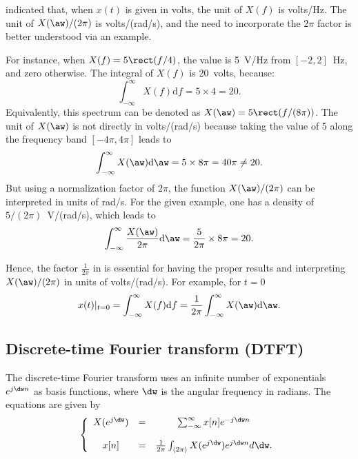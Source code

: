  indicated that, when $x(t)$ is given in volts, the unit of $X(f)$ is volts/Hz.
The unit of $X(\aw)/(2 \pi)$ is volts/(rad/s), and the need to incorporate the $2\pi$ factor is
better understood via an example.

For instance, when $X(f)= 5 \rect(f/4)$, the value is 5~V/Hz from $[-2, 2]$~Hz, and zero otherwise.
The integral of $X(f)$ is 20~volts, because:
\[
\int_{-\infty}^\infty X(f) \textrm{d}f = 5 \times 4 = 20. 
\]
Equivalently, this spectrum can be denoted as $X(\aw)= 5 \rect(f/(8\pi))$. The unit of
$X(\aw)$ is not directly in volts/(rad/s) because taking the value of 5 along the frequency band $[-4\pi, 4\pi]$ leads to
\[
\int_{-\infty}^\infty X(\aw) \textrm{d}\aw = 5 \times 8 \pi = 40 \pi \ne 20. 
\]
But using a normalization factor of $2\pi$, the function $X(\aw)/(2 \pi)$ can be interpreted 
in units of rad/s. For the given example, one has a density of $5/(2 \pi)$~V/(rad/s), which leads to
\[
\int_{-\infty}^\infty \frac{X(\aw)}{2 \pi}  \textrm{d}\aw = \frac{5}{2 \pi} \times 8 \pi = 20. 
\]

Hence, the factor $\frac{1}{2 \pi}$ in  is essential for having the
proper results and interpreting $X(\aw)/(2\pi)$ in units of volts/(rad/s). For example, for $t=0$
\begin{equation}
x(t)|_{t=0} = \int_{-\infty}^\infty X(f) \textrm{d}f = \frac{1}{2 \pi} \int_{-\infty}^\infty X(\aw) \textrm{d}\aw.
\end{equation}

\subsection{Discrete-time Fourier transform (DTFT)}
\label{subsec:dft}

The discrete-time Fourier transform uses an infinite number of exponentials $e^{j \dw n}$ as basis functions, where $\dw$ is the angular frequency in radians.
The equations are given by
\begin{equation}
\left\{
\begin{array}{ccc}
X(e^{j\dw}) & = & \sum_{-\infty}^\infty x[n] e^{-j \dw n} \\
& & \\
x[n] & = & \frac{1}{2 \pi} \int_{\langle 2 \pi\rangle} X(e^{j \dw}) e^{j \dw n} d\dw.
\\ \end{array}
\right.
\label{eq:fourier_transform}
\end{equation}

